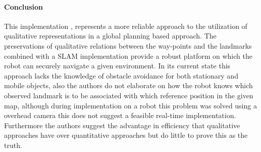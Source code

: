 	\begin{figure}[h!]%
		\centering
		\qquad
		\label{fig:hand drawn map}%
	\end{figure}
	\paragraph{Conclusion} This implementation \cite{shah2011robust}, represents a more reliable approach to the utilization of qualitative representations in a global planning based approach. The preservations of qualitative relations between the way-points and the landmarks combined with a SLAM implementation provide a robust platform on which the robot can securely navigate a given environment. In its current state this approach lacks the knowledge of obstacle avoidance for both stationary and mobile objects, also the authors do not elaborate on how the robot knows which observed landmark is to be associated with which reference position in the given map, although during implementation on a robot this problem was solved using a overhead camera this does not suggest a feasible real-time implementation. Furthermore the authors suggest the advantage in efficiency that qualitative approaches have over quantitative approaches but do little to prove this as the truth.
	
